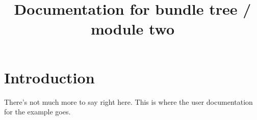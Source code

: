 \documentclass{article}
\begin{document}
\title{Documentation for bundle tree / module two}
\maketitle

\section{Introduction}

There's not much more to say right here.
This is where the user documentation for the example goes.
\end{document}
